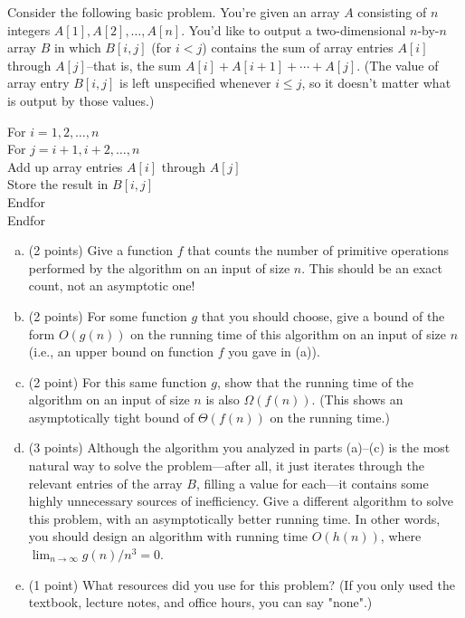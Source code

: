 \documentclass[11pt]{article}
\begin{document}
\newpage


Consider the following basic problem. You're given an array $A$ consisting of $n$ integers $A[1], A[2], \ldots, A[n]$. You'd like to output a two-dimensional $n$-by-$n$ array $B$ in which $B[i,j]$ (for $i < j$) contains the sum of array entries $A[i]$ through $A[j]$--that is, the sum $A[i] + A[i+1] + \cdots + A[j]$. (The value of array entry $B[i,j]$ is left unspecified whenever $i \leq j$, so it doesn't matter what is output by those values.)

\begin{algo}
   For $i = 1, 2, \ldots, n$\+ \\
   For $j = i + 1, i + 2, \ldots, n$\+ \\
   Add up array entries $A[i]$ through $A[j]$\\
   Store the result in $B[i,j]$\- \\
   Endfor\- \\
   Endfor
\end{algo}

\begin{enumerate}[(a)]

    \item (2 points) Give a function $f$ that counts the number of primitive operations performed
    by the algorithm on an input of size $n$. This should be an exact count, not an asymptotic one!

    \item (2 points) For some function $g$ that you should choose, give a bound of the form
    $O(g(n))$ on the running time of this algorithm on an input of size $n$
    (i.e., an upper bound on function $f$ you gave in (a)).    

    \item (2 point) For this same function $g$, show that the running time of the algorithm on an input of size $n$ is also $\Omega(f(n))$. (This shows an asymptotically tight bound of $\Theta(f(n))$ on the running time.)

     \item (3 points) Although the algorithm you
    analyzed in parts (a)--(c) is the most natural way to solve the
    problem---after all, it just iterates through the relevant entries of the
    array $B$, filling a value for each---it contains some highly unnecessary
    sources of inefficiency. Give a different algorithm to solve this problem,
    with an asymptotically better running time. In other words, you should
    design an algorithm with running time $O(h(n))$, where $\lim_{n \to \infty}
    g(n)/n^3 = 0$.  
    
    \item (1 point) What resources did you use for this problem? (If you only used the textbook, lecture notes, and office hours, you can say "none".)
    \end{enumerate}
    
\end{document}
